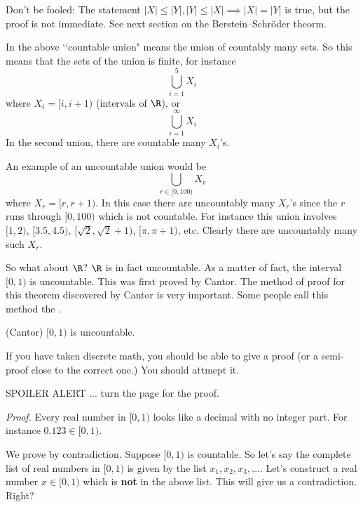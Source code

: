

Don't be fooled: The statement $|X| \leq |Y|, |Y| \leq |X| \implies
|X| = |Y|$ is true, but the proof is not immediate.
See next section on the Berstein--Schr\"oder theorm.














In the above \lq\lq countable union" means the union of
countably many sets.
So this means that the sets of the union is finite, for instance
\[
\bigcup_{i=1}^5 X_i
\]
where $X_i = [i, i + 1)$ (intervals of $\R$), or
\[
\bigcup_{i=1}^\infty X_i
\]
In the second union, there are countable many $X_i$'s.

An example of an uncountable union would be
\[
\bigcup_{r \in [0, 100)} X_r
\]
where $X_r = [r, r + 1)$.
  In this case there are uncountably many $X_r$'s since the
  $r$ runs through $[0, 100)$ which is not countable.
    For instance this union involves $[1, 2)$,
      $[3.5, 4.5)$,
      $[\sqrt{2}, \sqrt{2} + 1)$,
      $[\pi, \pi + 1)$, etc.
Clearly there are uncountably many such $X_r$.
            
So what about $\R$? $\R$ is in fact uncountable. As a matter of
fact, the interval $[0,1)$ is uncountable.
This was first proved by Cantor.
The method of proof for
this theorem discovered by Cantor
is very important. Some people call this method the
.

\begin{thm} \textnormal{(Cantor)}
$[0,1)$ is uncountable.
\end{thm}


If you have taken discrete math, you should be able to give a proof
(or a semi-proof close to the correct one.)
You should attmept it.

SPOILER ALERT ... turn the page for the proof.


\textit{Proof.} Every real number in $[0,1)$ looks like a decimal with no
integer part. For instance $0.123 \in [0,1)$.

We prove by contradiction. Suppose $[0,1)$ is countable. So let's say
the complete list of real numbers in $[0,1)$ is given by the list
$x_1, x_2, x_3, \ldots$. Let's construct a real number $x \in
[0,1)$ which is \textbf{not} in the above list. This will give us a
contradiction. Right?

